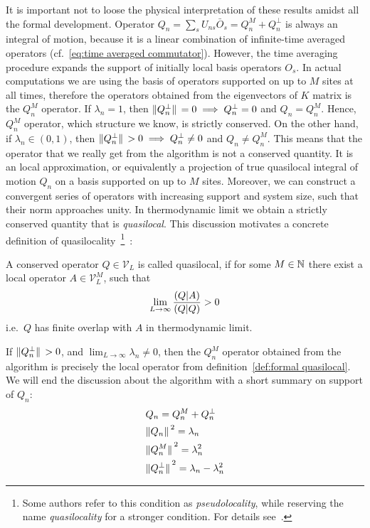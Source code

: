 It is important not to loose the physical interpretation of these results amidst all the formal development.
Operator \(Q_n = \sum_s U_{ns}\bar{O}_{s} = Q_n^M + Q_n^{\perp} \) is always an integral of motion, 
because it is a linear combination of infinite-time averaged operators (cf.~\eqref{eq:time averaged commutator}).
However, the time averaging procedure expands the support of initially local basis operators \(O_s\).
In actual computations we are using the basis of operators supported on up to \(M\) sites at all times, therefore the operators
obtained from the eigenvectors of \(K\) matrix is the \(Q_n^M\) operator. If \(\lambda_n = 1\), then
\(\norm*{Q_n^{\perp}} = 0 \implies Q_n^{\perp} = 0\) and \(Q_n = Q_n^M\). Hence, \(Q_n^M\) operator, which
structure we know, is strictly conserved. On the other hand, if \(\lambda_n \in (0,1) \), then
\(\norm*{Q_n^{\perp}} > 0 \implies Q_n^{\perp} \neq 0\) and \(Q_n \neq Q_n^M\). This means that the operator
that we really get from the algorithm is not a conserved quantity. It is an local approximation, or equivalently
a projection of true quasilocal integral of motion \(Q_n\) on a basis supported on up to \(M\) sites. Moreover, we can 
construct a convergent series of operators with increasing support and system size, such that their
norm approaches unity. In thermodynamic limit we obtain a strictly conserved
quantity that is \textit{quasilocal}. This discussion motivates a concrete definition
of quasilocality~\footnote{Some authors refer to this condition as \textit{pseudolocality},
while reserving the name \textit{quasilocality} for a stronger condition. For details
see~\textcite{Ilievski2016a}.}~\autocite{Mierzejewski2020b}:
\begin{definition}[Quasilocality]
A conserved operator \(Q\in \mathcal{V}_L\) is called quasilocal, if for some \(M\in \mathbb{N}\)
there exist a local operator \(A \in \mathcal{V}_L^M \), such that
\begin{equation*}
  \lim_{L\to \infty} \frac{\left(Q \middle| A\right)}{\left(Q \middle| Q\right)} > 0
\end{equation*}
i.e.\ \(Q\) has finite overlap with \(A\) in thermodynamic limit.
  \label{def:formal quasilocal}
\end{definition}
If \(\norm*{Q_n^{\perp}} > 0\), and \(\lim_{L\to \infty} \lambda_n \neq 0\),
then the \(Q_n^M\) operator obtained from the algorithm is precisely the local operator from
definition~\ref{def:formal quasilocal}.
We will end the discussion about the algorithm with 
a short summary on support of \(Q_n\):
\begin{align}
  & Q_n = Q_n^M + Q_n^{\perp}\nonumber\\
  & \norm*{Q_n}^2 = \lambda_n \nonumber\\
  & \norm*{Q_n^M}^2 = \lambda_n^2 \nonumber\\
  & \norm*{Q_n^{\perp}}^2 = \lambda_n - \lambda_n^2
  \label{eq:summary of support}
\end{align}

